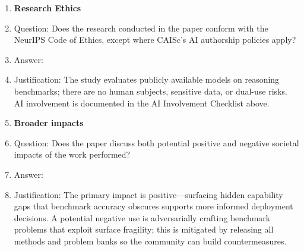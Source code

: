 \begin{enumerate}
\item {\bf Research Ethics}
    \item[] Question: Does the research conducted in the paper conform with the
    NeurIPS Code of Ethics, except where CAISc's AI authorship policies apply?
    \item[] Answer: \answerYes{}
    \item[] Justification: The study evaluates publicly available models on
    reasoning benchmarks; there are no human subjects, sensitive data, or
    dual-use risks. AI involvement is documented in the AI Involvement
    Checklist above.

\item {\bf Broader impacts}
    \item[] Question: Does the paper discuss both potential positive and
    negative societal impacts of the work performed?
    \item[] Answer: \answerYes{}
    \item[] Justification: The primary impact is positive---surfacing hidden
    capability gaps that benchmark accuracy obscures supports more informed
    deployment decisions. A potential negative use is adversarially crafting
    benchmark problems that exploit surface fragility; this is mitigated by
    releasing all methods and problem banks so the community can build
    countermeasures.

\end{enumerate}
